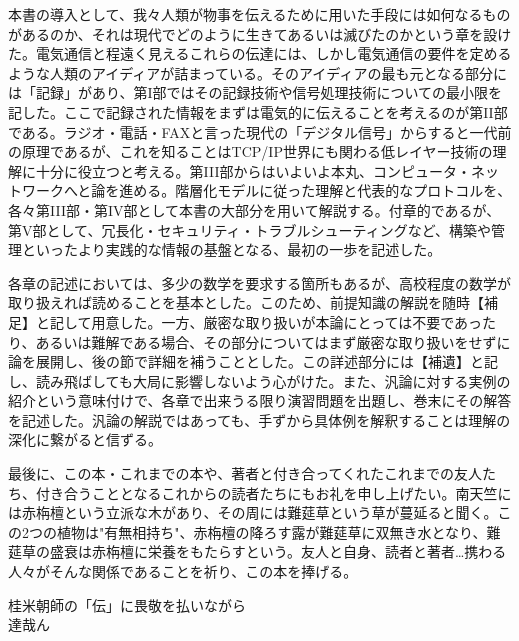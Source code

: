 本書の導入として、我々人類が物事を伝えるために用いた手段には如何なるものがあるのか、それは現代でどのように生きてあるいは滅びたのかという章を設けた。電気通信と程遠く見えるこれらの伝達には、しかし電気通信の要件を定めるような人類のアイディアが詰まっている。そのアイディアの最も元となる部分には「記録」があり、第I部ではその記録技術や信号処理技術についての最小限を記した。ここで記録された情報をまずは電気的に伝えることを考えるのが第II部である。ラジオ・電話・FAXと言った現代の「デジタル信号」からすると一代前の原理であるが、これを知ることはTCP/IP世界にも関わる低レイヤー技術の理解に十分に役立つと考える。第III部からはいよいよ本丸、コンピュータ・ネットワークへと論を進める。階層化モデルに従った理解と代表的なプロトコルを、各々第III部・第IV部として本書の大部分を用いて解説する。付章的であるが、第V部として、冗長化・セキュリティ・トラブルシューティングなど、構築や管理といったより実践的な情報の基盤となる、最初の一歩を記述した。

各章の記述においては、多少の数学を要求する箇所もあるが、高校程度の数学が取り扱えれば読めることを基本とした。このため、前提知識の解説を随時【補足】と記して用意した。一方、厳密な取り扱いが本論にとっては不要であったり、あるいは難解である場合、その部分についてはまず厳密な取り扱いをせずに論を展開し、後の節で詳細を補うこととした。この詳述部分には【補遺】と記し、読み飛ばしても大局に影響しないよう心がけた。また、汎論に対する実例の紹介という意味付けで、各章で出来うる限り演習問題を出題し、巻末にその解答を記述した。汎論の解説ではあっても、手ずから具体例を解釈することは理解の深化に繋がると信ずる。

最後に、この本・これまでの本や、著者と付き合ってくれたこれまでの友人たち、付き合うこととなるこれからの読者たちにもお礼を申し上げたい。南天竺には赤栴檀という立派な木があり、その周には難莚草という草が蔓延ると聞く。この2つの植物は"有無相持ち"、赤栴檀の降ろす露が難莚草に双無き水となり、難莚草の盛衰は赤栴檀に栄養をもたらすという。友人と自身、読者と著者…携わる人々がそんな関係であることを祈り、この本を捧げる。

\begin{flushright}
桂米朝師の「伝」に畏敬を払いながら \\
達哉ん
\end{flushright}
